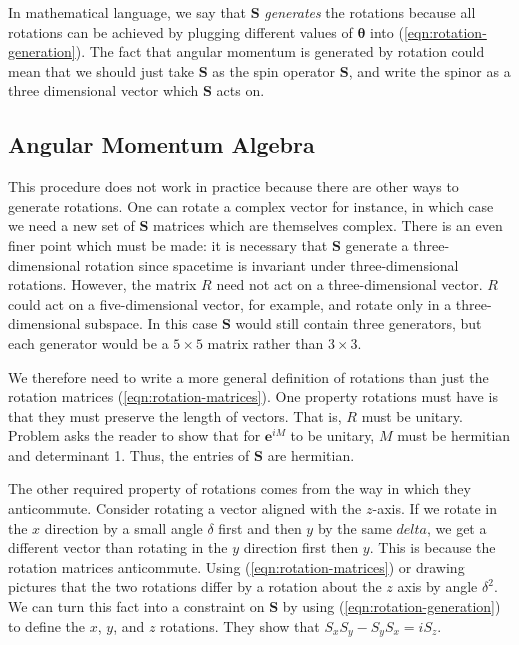In mathematical language, we say that $\bm S$ \emph{generates} the rotations because all rotations can be achieved by plugging different values of $\bm \theta$ into (\ref{eqn:rotation-generation}). The fact that angular momentum is generated by rotation could mean that we should just take $\bm S$ as the spin operator $\bm S$, and write the spinor as a three dimensional vector which $\bm S$ acts on.

\subsection{Angular Momentum Algebra}

This procedure does not work in practice because there are other ways to generate rotations. One can rotate a complex vector for instance, in which case we need a new set of $\bm S$ matrices which are themselves complex. There is an even finer point which must be made: it is necessary that $\bm S$ generate a three-dimensional rotation since spacetime is invariant under three-dimensional rotations. However, the matrix $R$ need not act on a three-dimensional vector. $R$ could act on a five-dimensional vector, for example, and rotate only in a three-dimensional subspace. In this case $\bm S$ would still contain three generators, but each generator would be a $5\times 5$ matrix rather than $3\times 3$.

We therefore need to write a more general definition of rotations than just the rotation matrices (\ref{eqn:rotation-matrices}). One property rotations must have is that they must preserve the length of vectors. That is, $R$ must be unitary. Problem  asks the reader to show that for $\bm e^{iM}$ to be unitary, $M$ must be hermitian and determinant 1. Thus, the entries of $\bm S$ are hermitian.

The other required property of rotations comes from the way in which they anticommute. Consider rotating a vector aligned with the $z$-axis. If we rotate in the $x$ direction by a small angle $\delta$ first and then $y$ by the same $delta$, we get a different vector than rotating in the $y$ direction first then $y$. This is because the rotation matrices anticommute. Using (\ref{eqn:rotation-matrices}) or drawing pictures that the two rotations differ by a rotation about the $z$ axis by angle $\delta^2$. We can turn this fact into a constraint on $\bm S$ by using (\ref{eqn:rotation-generation}) to define the $x$, $y$, and $z$ rotations. They show that $S_xS_y - S_yS_x = i S_z$.

